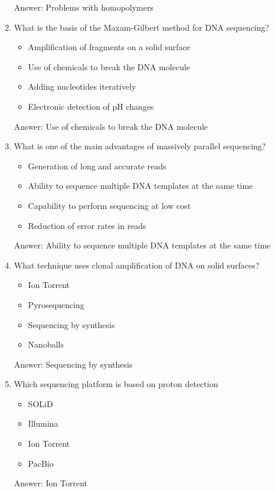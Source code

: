 \begin{enumerate}
Answer: Problems with homopolymers

\item What is the basis of the Maxam-Gilbert method for DNA sequencing?
\begin{itemize}
\item Amplification of fragments on a solid surface
\item Use of chemicals to break the DNA molecule
\item Adding nucleotides iteratively
\item Electronic detection of pH changes
\end{itemize}

Answer: Use of chemicals to break the DNA molecule

\item What is one of the main advantages of massively parallel sequencing?
\begin{itemize}
\item Generation of long and accurate reads
\item Ability to sequence multiple DNA templates at the same time
\item Capability to perform sequencing at low cost
\item Reduction of error rates in reads
\end{itemize}

Answer: Ability to sequence multiple DNA templates at the same time

\item What technique uses clonal amplification of DNA on solid surfaces?
\begin{itemize}
\item Ion Torrent
\item Pyrosequencing
\item Sequencing by synthesis
\item Nanoballs
\end{itemize}

Answer: Sequencing by synthesis

\item Which sequencing platform is based on proton detection
\begin{itemize}
\item SOLiD
\item Illumina
\item Ion Torrent
\item PacBio
\end{itemize}

Answer: Ion Torrent


\end{enumerate}
